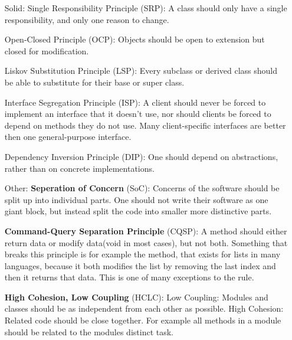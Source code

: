 \documentclass{article}
\begin{document}
\begin{enumerate}
    \item[\huge{Solid:}]
        {\huge S}ingle Responsibility Principle (SRP):\newline
        A class should only have a single responsibility, and only one reason to change.

            {\huge O}pen-Closed Principle (OCP):\newline
        Objects should be open to extension but closed for modification.

            {\huge L}iskov Substitution Principle (LSP):\newline
        Every subclass or derived class should be able to substitute
        for their base or super class.

            {\huge I}nterface Segregation Principle (ISP):\newline
        A client should never be forced to implement an interface that it doesn't use, nor
        should clients be forced to depend on methods they do not use. Many
        client-specific interfaces are better then one general-purpose interface.

            {\huge D}ependency Inversion Principle (DIP):\newline
        One should depend on abstractions, rather than on concrete implementations.

    \item[\huge Other:]
        \textbf{Seperation of Concern} (SoC):\newline
        Concerns of the software should be split up into individual parts.
        One should not write their software as one giant block, but instead
        split the code into smaller more distinctive parts.

        \textbf{Command-Query Separation Principle} (CQSP):\newline
        A method should either return data or modify data(void in most cases),
        but not both.\newline
        Something that breaks this principle is for example the  method, that
        exists for lists in many languages, because it both modifies the list by removing
        the last index and then it returns that data. This is one of many exceptions to the rule.

        \textbf{High Cohesion, Low Coupling} (HCLC):\newline
        Low Coupling: Modules and classes should be as independent from each other as possible.
        \newline
        High Cohesion: Related code should be close together. For example all methods
        in a module should be related to the modules distinct task.


\end{enumerate}
\end{document}
